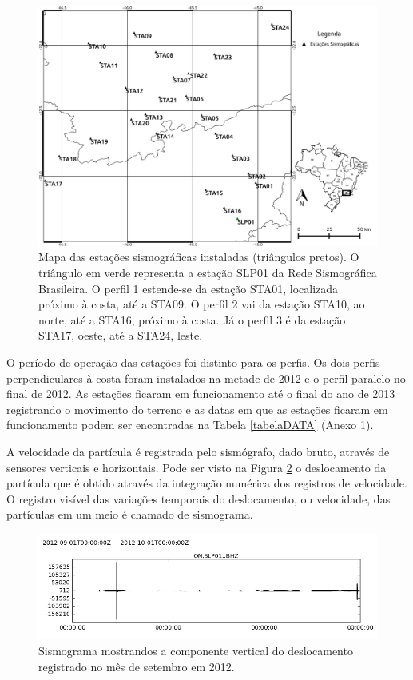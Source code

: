 \begin{figure}[!ht]
\centering
\includegraphics[scale=0.5]{Figs/mapa_das_estacoes_simosgraficas_instaladas.png}
\caption[Mapa das estações sismográficas instaladas]{Mapa das estações sismográficas instaladas (triângulos pretos). O triângulo em verde representa a estação SLP01 da Rede Sismográfica Brasileira. O perfil 1 estende-se da estação STA01, localizada próximo à costa, até a STA09. O perfil 2 vai da estação STA10, ao norte, até a STA16, próximo à costa. Já o perfil 3 é da estação STA17, oeste, até a STA24, leste.}
\label{map_loc}
\end{figure}

O período de operação das estações foi distinto para os perfis. Os dois perfis perpendiculares à costa foram instalados na metade de 2012 e o perfil paralelo no final de 2012. As estações ficaram em funcionamento até o final do ano de 2013 registrando o movimento do terreno e as datas em que as estações ficaram em funcionamento podem ser encontradas na Tabela \ref{tabelaDATA} (Anexo 1). 

A velocidade da partícula é registrada pelo sismógrafo, dado bruto, através de sensores verticais e horizontais. Pode ser visto na Figura \ref{simograma} o deslocamento da partícula que é obtido através da integração numérica dos registros de velocidade. O registro visível das variações temporais do deslocamento, ou velocidade, das partículas em um meio é chamado de sismograma. 

\begin{figure}[!ht]
\centering
\includegraphics[scale=0.75]{Figs/comp_z_SLP01.png}
\caption{Sismograma mostrandos a componente vertical do deslocamento registrado no mês de setembro em 2012.}
\label{simograma}
\end{figure}

